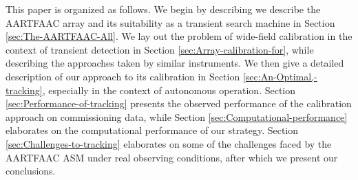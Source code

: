 \documentclass{aa}
\begin{document}
 This paper  is organized as  follows.  We begin  by describing we  describe the
 AARTFAAC array  and its  suitability as a  transient search machine  in Section
 \ref{sec:The-AARTFAAC-All}. We lay out the problem of wide-field calibration in
 the context of  transient detection in Section \ref{sec:Array-calibration-for},
 while describing the  approaches taken by similar instruments.   We then give a
 detailed   description  of  our   approach  to   its  calibration   in  Section
 \ref{sec:An-Optimal,-tracking},  especially   in  the  context   of  autonomous
 operation.   Section  \ref{sec:Performance-of-tracking}  presents the  observed
 performance of  the calibration approach  on commissioning data,  while Section
 \ref{sec:Computational-performance}  elaborates on the  computational performance
 of our  strategy.  Section \ref{sec:Challenges-to-tracking}  elaborates on some
 of the  challenges faced by the  AARTFAAC ASM under  real observing conditions,
 after which we present our conclusions.
\end{document}
